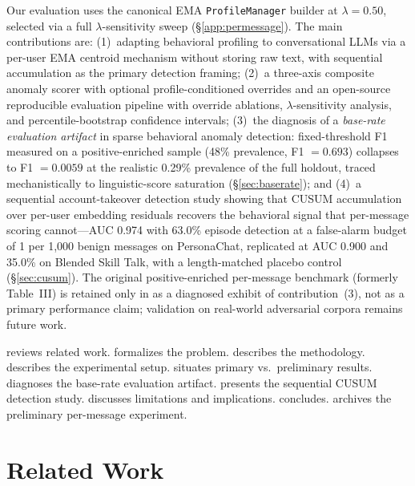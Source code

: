 \documentclass[conference]{IEEEtran}
\begin{document}
Our evaluation uses the canonical EMA \texttt{ProfileManager} builder at
$\lambda{=}0.50$, selected via a full $\lambda$-sensitivity sweep
(\S\ref{app:permessage}).
The main contributions are:
(1)~adapting behavioral profiling to conversational LLMs via a per-user EMA
centroid mechanism without storing raw text, with sequential accumulation as the
primary detection framing;
(2)~a three-axis composite anomaly scorer with optional profile-conditioned
overrides and an open-source reproducible evaluation pipeline with override
ablations, $\lambda$-sensitivity analysis, and percentile-bootstrap confidence
intervals;
(3)~the diagnosis of a \emph{base-rate evaluation artifact} in sparse behavioral
anomaly detection: fixed-threshold F1 measured on a positive-enriched sample
(48\% prevalence, F1 $= 0.693$) collapses to F1 $= 0.0059$ at the realistic 0.29\%
prevalence of the full holdout, traced mechanistically to linguistic-score
saturation (\S\ref{sec:baserate}); and
(4)~a sequential account-takeover detection study showing that CUSUM accumulation
over per-user embedding residuals recovers the behavioral signal that per-message
scoring cannot---AUC 0.974 with 63.0\% episode detection at a false-alarm budget of
1 per 1{,}000 benign messages on PersonaChat, replicated at AUC 0.900 and 35.0\% on
Blended Skill Talk, with a length-matched placebo control (\S\ref{sec:cusum}).
The original positive-enriched per-message benchmark (formerly Table~III) is
retained only in  as a diagnosed exhibit of contribution~(3),
not as a primary performance claim; validation on real-world adversarial corpora
remains future work.

 reviews related work.
 formalizes the problem.
 describes the methodology.
 describes the experimental setup.
 situates primary vs.\ preliminary results.
 diagnoses the base-rate evaluation artifact.
 presents the sequential CUSUM detection study.
 discusses limitations and implications.
 concludes.
 archives the preliminary per-message experiment.


\section{Related Work}
\label{sec:related}
\end{document}
